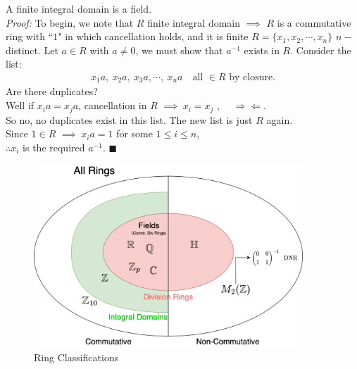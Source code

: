 \begin{lemma} 
A finite integral domain is a field. \steezybreak\\
\noindent \textit{Proof:}
To begin, we note that $R$ finite integral domain $\implies$ $R$ is a commutative ring with ``$1$" in which cancellation holds, and it is finite $R=\{x_1,x_2,\cdots, x_n\}$ $n-$distinct. Let $a\in R$ with $a\neq 0$, we must show that $a^{-1}$ exists in $R$. Consider the list:
\begin{align}
    x_1a, \ x_2a, \ x_3a, \cdots, \ x_na \ \ \ \text{ all }\in R \text{ by closure.} \nonumber
\end{align}
Are there duplicates? \\ 
Well if $x_ia=x_ja$, cancellation in $R$ $\implies \ x_i=x_j$ , \ \ $\Rightarrow\Leftarrow$. \\ 
So no, no duplicates exist in this list. The new list is just $R$ again. \\ 
Since $1\in R$ $\implies \ x_ia=1$ for some $1\leq i \leq n$, \\ 
$\therefore x_i$ is the required $a^{-1}$. $\blacksquare$
\end{lemma}
\begin{figure}
    \centering
    \includegraphics[width=0.9\textwidth]{Figures/Ring Classifications.png}
    \caption{Ring Classifications}
    \label{fig:ring-classifications}
\end{figure}

